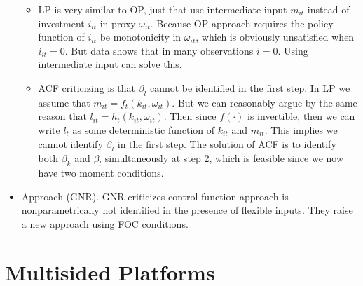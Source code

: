 \documentclass{book}
\theoremstyle{plain}
\theoremstyle{definition}
\begin{document}
\begin{itemize}
\begin{itemize}
		\item LP is very similar to OP, just that use intermediate input $m_{it}$ instead of investment $i_{it}$ in proxy $\omega_{it}$. Because OP approach requires the policy function of $i_{it}$ be monotonicity in $\omega_{it}$, which is obviously unsatisfied when $i_{it}=0$. But data shows that in many observations $i=0$. Using intermediate input can solve this.

		\item ACF criticizing is that $\beta_l$ cannot be identified in the first step. In LP we assume that $m_{it}=f_t(k_{it},\omega_{it})$. But we can reasonably argue by the same reason that $l_{it}=h_t(k_{it},\omega_{it})$. Then since $f(\cdot)$ is invertible, then we can write $l_t$ as some deterministic function of $k_{it}$ and $m_{it}$. This implies we cannot identify $\beta_l$ in the first step. The solution of ACF is to identify both $\beta_k$ and $\beta_l$ simultaneously at step 2, which is feasible since we now have two moment conditions.
	\end{itemize}
	\item \cite*{Gandhi:2017un} Approach (GNR). GNR criticizes control function approach is nonparametrically not identified in the presence of flexible inputs. They raise a new approach using FOC conditions.
\end{itemize}











\chapter{Multisided Platforms} %
\label{cha:multisided_platforms}
\end{document}
